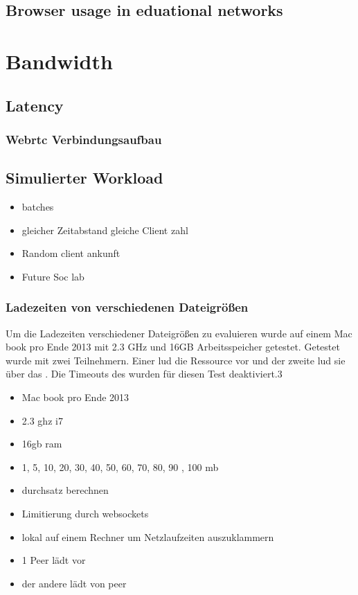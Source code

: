 \subsection{Browser usage in eduational networks}

\section{Bandwidth}

\subsection{Latency}

\subsubsection{Webrtc Verbindungsaufbau}

\subsection{Simulierter Workload}
\begin{itemize}
	\item batches
	\item gleicher Zeitabstand gleiche Client zahl
	\item Random client ankunft
	\item Future Soc lab
\end{itemize}

\subsubsection{Ladezeiten von verschiedenen Dateigrößen}
Um die Ladezeiten verschiedener Dateigrößen zu evaluieren wurde auf einem Mac book pro Ende 2013 mit 2.3 GHz und 16GB Arbeitsspeicher getestet. 
Getestet wurde mit zwei Teilnehmern. Einer lud die Ressource vor und der zweite lud sie über das \pTp \cdn. Die Timeouts des \pTp \cdns wurden für diesen Test deaktiviert.3

\begin{itemize}
	\item Mac book pro Ende 2013
	\item 2.3 ghz i7
	\item 16gb ram
	\item 1, 5, 10, 20, 30, 40, 50, 60, 70, 80, 90 , 100 mb
	\item durchsatz berechnen
	\item Limitierung durch websockets
	\item lokal auf einem Rechner um Netzlaufzeiten auszuklammern
	\item 1 Peer lädt vor
	\item der andere lädt von peer
\end{itemize}
